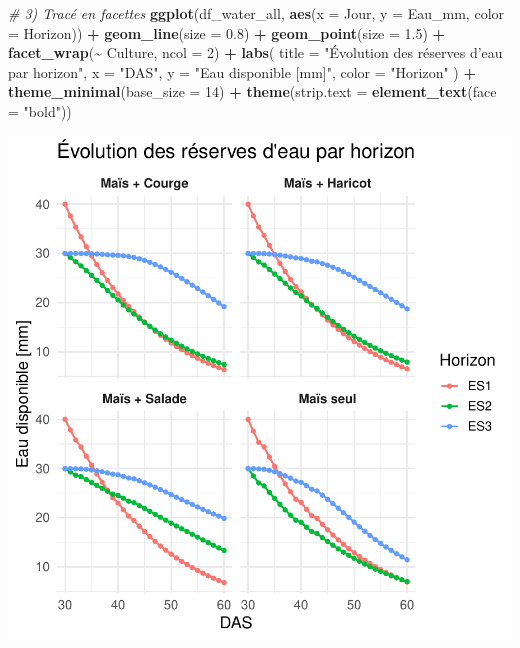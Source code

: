 \documentclass[
]{article}
\newenvironment{Shaded}{\begin{snugshade}}{\end{snugshade}}
\newcommand{\AttributeTok}[1]{\textcolor[rgb]{0.13,0.29,0.53}{#1}}
\newcommand{\CommentTok}[1]{\textcolor[rgb]{0.56,0.35,0.01}{\textit{#1}}}
\newcommand{\DecValTok}[1]{\textcolor[rgb]{0.00,0.00,0.81}{#1}}
\newcommand{\FloatTok}[1]{\textcolor[rgb]{0.00,0.00,0.81}{#1}}
\newcommand{\FunctionTok}[1]{\textcolor[rgb]{0.13,0.29,0.53}{\textbf{#1}}}
\newcommand{\NormalTok}[1]{#1}
\newcommand{\SpecialCharTok}[1]{\textcolor[rgb]{0.81,0.36,0.00}{\textbf{#1}}}
\newcommand{\StringTok}[1]{\textcolor[rgb]{0.31,0.60,0.02}{#1}}
\begin{document}
\begin{Shaded}
\begin{Highlighting}[]
\CommentTok{\# 3) Tracé en facettes}
\FunctionTok{ggplot}\NormalTok{(df\_water\_all, }\FunctionTok{aes}\NormalTok{(}\AttributeTok{x =}\NormalTok{ Jour, }\AttributeTok{y =}\NormalTok{ Eau\_mm, }\AttributeTok{color =}\NormalTok{ Horizon)) }\SpecialCharTok{+}
  \FunctionTok{geom\_line}\NormalTok{(}\AttributeTok{size =} \FloatTok{0.8}\NormalTok{) }\SpecialCharTok{+}
  \FunctionTok{geom\_point}\NormalTok{(}\AttributeTok{size =} \FloatTok{1.5}\NormalTok{) }\SpecialCharTok{+}
  \FunctionTok{facet\_wrap}\NormalTok{(}\SpecialCharTok{\textasciitilde{}}\NormalTok{ Culture, }\AttributeTok{ncol =} \DecValTok{2}\NormalTok{) }\SpecialCharTok{+}
  \FunctionTok{labs}\NormalTok{(}
    \AttributeTok{title =} \StringTok{"Évolution des réserves d’eau par horizon"}\NormalTok{,}
    \AttributeTok{x     =} \StringTok{"DAS"}\NormalTok{,}
    \AttributeTok{y     =} \StringTok{"Eau disponible [mm]"}\NormalTok{,}
    \AttributeTok{color =} \StringTok{"Horizon"}
\NormalTok{  ) }\SpecialCharTok{+}
  \FunctionTok{theme\_minimal}\NormalTok{(}\AttributeTok{base\_size =} \DecValTok{14}\NormalTok{) }\SpecialCharTok{+}
  \FunctionTok{theme}\NormalTok{(}\AttributeTok{strip.text =} \FunctionTok{element\_text}\NormalTok{(}\AttributeTok{face =} \StringTok{"bold"}\NormalTok{))}
\end{Highlighting}
\end{Shaded}

\begin{center}\includegraphics[width=0.7\linewidth]{Rapport_final_Maxime_CORNEZ_files/figure-latex/graphe-es-1} \end{center}
\end{document}

